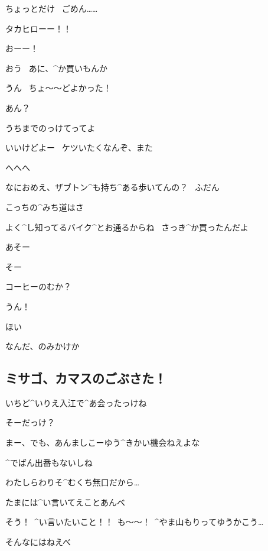 \Alpha ちょっとだけ
\ ごめん……

\page
\Makki タカヒローー！！

\page
\Makki おーー！

\Takahiro おう
\ あに、^{か}{買}いもんか

\Makki うん
\ ちょ〜〜どよかった！

\Takahiro あん？

\Makki うちまでのっけてってよ

\page
\Takahiro いいけどよー
\ ケツいたくなんぞ、また

\Makki へへへ

\Takahiro なにおめえ、ザブトン^{も}{持}ち^{ある}{歩}いてんの？
\ ふだん

\Makki こっちの^{みち}{道}はさ

\Makki よく^{し}{知}ってるバイク^{とお}{通}るからね
\ さっき^{か}{買}ったんだよ

\page
\Takahiro あそー

\Makki そー

\Takahiro コーヒーのむか？

\Makki うん！

\page
\Takahiro ほい

\Makki なんだ、のみかけか


\subsection{ミサゴ、カマスのごぶさた！}

 いちど^{いりえ}{入江}で^{あ}{会}ったっけね

 そーだっけ？

 まー、でも、あんましこーゆう^{きかい}{機会}ねえよな

 ^{でばん}{出番}もないしね

 わたしらわりそ^{むくち}{無口}だから…

 たまには^{い}{言}いてえことあんべ

 そう！\ ^{い}{言}いたいこと！！\ も〜〜！\ ^{やま}{山}もりってゆうかこう…

 そんなにはねえべ
